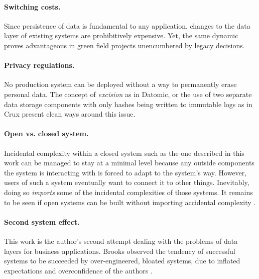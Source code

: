 \paragraph{Switching costs.} Since persistence of data is fundamental to any application, changes to the data layer of existing systems are prohibitively expensive. Yet, the same dynamic proves advantageous in green field projects unencumbered by legacy decisions.

\paragraph{Privacy regulations.} No production system can be deployed without a way to permanently erase personal data. The concept of \emph{excision} as in Datomic, or the use of two separate data storage components with only hashes being written to immutable logs as in Crux present clean ways around this issue.

\paragraph{Open vs. closed system.} Incidental complexity within a closed system such as the one described in this work can be managed to stay at a minimal level because any outside components the system is interacting with is forced to adapt to the system's way. However, users of such a system eventually want to connect it to other things. Inevitably, doing so \emph{imports} some of the incidental complexities of those systems. It remains to be seen if open systems can be built without importing accidental complexity \cite{moffat16eve}.

\paragraph{Second system effect.} This work is the author's second attempt dealing with the problems of data layers for business applications. Brooks observed the tendency of successful systems to be succeeded by over-engineered, bloated systems, due to inflated expectations and overconfidence of the authors \cite{brooks1995mythical}.
